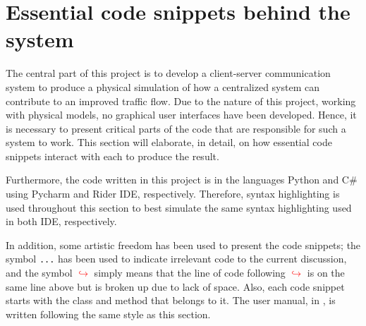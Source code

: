 \section{Essential code snippets behind the system}
The central part of this project is to develop a client-server communication system to produce a physical simulation of how a centralized system can contribute to an improved traffic flow. Due to the nature of this project, working with physical models, no graphical user interfaces have been developed. Hence, it is necessary to present critical parts of the code that are responsible for such a system to work. This section will elaborate, in detail, on how essential code snippets interact with each to produce the result.

Furthermore, the code written in this project is in the languages Python and C\# using Pycharm and Rider IDE, respectively. Therefore, syntax highlighting is used throughout this section to best simulate the same syntax highlighting used in both IDE, respectively. 

In addition, some artistic freedom has been used to present the code snippets; the symbol \verb|...| has been used to indicate irrelevant code to the current discussion, and the symbol  \textcolor{red}{$\hookrightarrow$} simply means that the line of code following \textcolor{red}{$\hookrightarrow$} is on the same line above but is broken up due to lack of space. Also, each code snippet starts with the class and method that belongs to it. The user manual, in , is written following the same style as this section.




